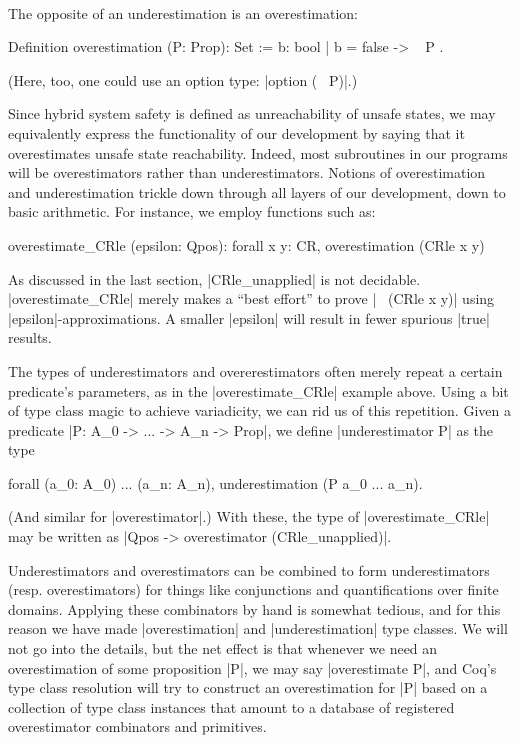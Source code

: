 \documentclass[runningheads]{llncs}
\begin{document}
\

\noindent The opposite of an underestimation is an overestimation:
\begin{code}
Definition overestimation (P: Prop): Set := { b: bool | b = false -> ~ P }.
\end{code}
(Here, too, one could use an option type: |option (~ P)|.)

Since hybrid system safety is defined as unreachability of unsafe states, we may equivalently express the functionality of our development by saying that it overestimates unsafe state reachability. Indeed, most subroutines in our programs will be overestimators rather than underestimators. Notions of overestimation and underestimation trickle down through all layers of our development, down to basic arithmetic. For instance, we employ functions such as:



\begin{code}
overestimate_CRle (epsilon: Qpos): forall x y: CR, overestimation (CRle x y)
\end{code}
As discussed in the last section, |CRle_unapplied| is not decidable. |overestimate_CRle| merely makes a ``best effort'' to prove |~ (CRle x y)| using |epsilon|-approximations. A smaller |epsilon| will result in fewer spurious |true| results.



The types of underestimators and overerestimators often merely repeat a certain predicate's parameters, as in the |overestimate_CRle| example above. Using a bit of type class magic to achieve variadicity, we can rid us of this repetition. Given a predicate |P: A_0 -> ... -> A_n -> Prop|, we define |underestimator P| as the type \begin{code}forall (a_0: A_0) ... (a_n: A_n), underestimation (P a_0 ... a_n).\end{code} (And similar for |overestimator|.) With these, the type of |overestimate_CRle| may be written as |Qpos -> overestimator (CRle_unapplied)|.

Underestimators and overestimators can be combined to form underestimators (resp. overestimators) for things like conjunctions and quantifications over finite domains. Applying these combinators by hand is somewhat tedious, and for this reason we have made |overestimation| and |underestimation| type classes. We will not go into the details, but the net effect is that whenever we need an overestimation of some proposition |P|, we may say |overestimate P|, and Coq's type class resolution will try to construct an overestimation for |P| based on a collection of type class instances that amount to a database of registered overestimator combinators and primitives.
\end{document}
